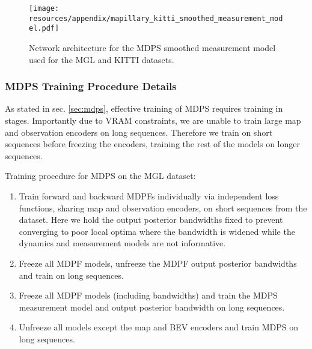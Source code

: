         \begin{figure}[ht]
            \centering
            \texttt{[image: resources/appendix/mapillary\_kitti\_smoothed\_measurement\_model.pdf]}
            \caption{\small{Network architecture for the MDPS smoothed measurement model used for the MGL and KITTI datasets.}}
            \label{appx_fig:mapillary_smoothed_measurement}
        \end{figure}

    
    \subsubsection{MDPS Training Procedure Details}
        As stated in sec. \ref{sec:mdps}, effective training of MDPS requires training in stages. Importantly due to VRAM constraints, we are unable to train large map and observation encoders on long sequences.  Therefore we train on short sequences before freezing the encoders, training the rest of the models on longer sequences.
        
        Training procedure for MDPS on the MGL dataset: 
        \begin{enumerate}   
            \item Train forward and backward MDPFs individually via independent loss functions, sharing map and observation encoders, on short sequences from the dataset. Here we hold the output posterior bandwidths fixed to prevent converging to poor local optima where the bandwidth is widened while the dynamics and measurement models are not informative.
            \item Freeze all MDPF models, unfreeze the MDPF output posterior bandwidths and train on long sequences.
            \item Freeze all MDPF models (including bandwidths) and train the MDPS measurement model and output posterior bandwidth on long sequences.
            \item Unfreeze all models except the map and BEV encoders and train MDPS on long sequences.
        \end{enumerate}

